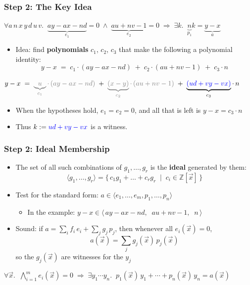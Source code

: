 \documentclass[usepdftitle=false,aspectratio=169,usenames,dvipsnames]{beamer}
\newcommand\pvitem{\pause\vfill\item}
\begin{document}
\begin{frame}
  \frametitle{Step 2: The Key Idea}
  \begin{tcolorbox}[colback=green!5,colframe=green!40!black,title=Example,top=1pt,bottom=1pt,after skip=6pt]
    \centering
    $\forall a\, n\, x\, y\, d\, u\, v.\;\; \underbrace{ay - ax - nd}_{e_1} = 0 \;\wedge\; \underbrace{au + nv - 1}_{e_2} = 0 \;\Rightarrow\; \exists k.\;\; \underbrace{n}_{p_1} k = \underbrace{y - x}_{a}$
  \end{tcolorbox}
  \begin{itemize}
    \item Idea: find \textbf{polynomials} $c_1$, $c_2$, $c_3$ that make the following a polynomial identity:
      \[ y - x \;=\; c_1 \cdot (ay - ax - nd) \;+\; c_2 \cdot (au + nv - 1) \;+\; c_3 \cdot n \]
  \end{itemize}
  \begin{tcolorbox}[colback=blue!5,colframe=blue!50!black,title=Solution,top=1pt,bottom=1pt]
    \centering
    $y - x \;=\; \textcolor{gray}{\underbrace{u}_{c_1} \cdot\, (ay - ax - nd)} \;+\; \textcolor{gray}{\underbrace{(x - y)}_{c_2} \cdot\, (au + nv - 1)} \;+\; \underbrace{\textcolor{blue}{(ud + vy - vx)}}_{c_3} \cdot\, n$
  \end{tcolorbox}
  \begin{itemize}
    \item When the hypotheses hold, $e_1 = e_2 = 0$, and all that is left is $y - x = c_3 \cdot n$
    \item Thus $k := \textcolor{blue}{ud + vy - vx}$ is a witness.
  \end{itemize}
\end{frame}

\begin{frame}
  \frametitle{Step 2: Ideal Membership}
  \begin{itemize}
    \item The set of all such combinations of $g_1, \dots, g_r$ is the \textbf{ideal} generated by them:
      \[ \langle g_1, \dots, g_r \rangle = \{\, c_1 g_1 + \dots + c_r g_r \;\mid\; c_i \in \mathbb{Z}[\vec{x}] \,\} \]
    \pvitem Test for the standard form: \quad $a \in \langle e_1, \dots, e_m, p_1, \dots, p_n \rangle$
      \begin{itemize}
        \item In the example: \quad $y - x \in \langle\, ay - ax - nd,\;\; au + nv - 1,\;\; n \,\rangle$
      \end{itemize}
    \pvitem Sound: if $a = \sum_i f_i\, e_i + \sum_j g_j\, p_j$, then whenever all $e_i(\vec{x}) = 0$,
      \[ a(\vec{x}) = \textstyle\sum_j g_j(\vec{x})\, p_j(\vec{x}) \]
      so the $g_j(\vec{x})$ are witnesses for the $y_j$
  \end{itemize}
  \vfill
  \begin{tcolorbox}[colback=gray!6,colframe=gray!60!black,title=Standard form,top=1pt,bottom=1pt]
    \centering
    $\forall \vec{x}.\;\; \textstyle\bigwedge_{i=1}^{m} e_i(\vec{x}) = 0 \;\Rightarrow\; \exists y_1 \cdots y_n.\;\; p_1(\vec{x})\, y_1 + \cdots + p_n(\vec{x})\, y_n = a(\vec{x})$
  \end{tcolorbox}
\end{frame}
\end{document}
